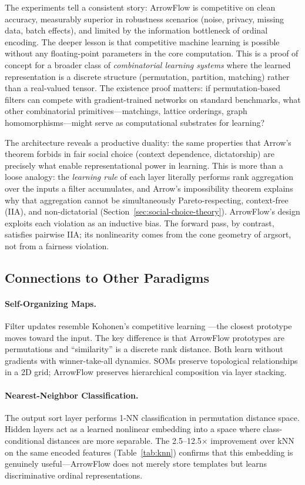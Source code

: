 \documentclass[12pt]{article}
\begin{document}
The experiments tell a consistent story: ArrowFlow is competitive on clean accuracy, measurably superior in robustness scenarios (noise, privacy, missing data, batch effects), and limited by the information bottleneck of ordinal encoding. The deeper lesson is that competitive machine learning is possible without any floating-point parameters in the core computation. This is a proof of concept for a broader class of \emph{combinatorial learning systems} where the learned representation is a discrete structure (permutation, partition, matching) rather than a real-valued tensor. The existence proof matters: if permutation-based filters can compete with gradient-trained networks on standard benchmarks, what other combinatorial primitives---matchings, lattice orderings, graph homomorphisms---might serve as computational substrates for learning?

The architecture reveals a productive duality: the same properties that Arrow's theorem forbids in fair social choice (context dependence, dictatorship) are precisely what enable representational power in learning. This is more than a loose analogy: the \emph{learning rule} of each layer literally performs rank aggregation over the inputs a filter accumulates, and Arrow's impossibility theorem explains why that aggregation cannot be simultaneously Pareto-respecting, context-free (IIA), and non-dictatorial (Section~\ref{sec:social-choice-theory}). ArrowFlow's design exploits each violation as an inductive bias. The forward pass, by contrast, satisfies pairwise IIA; its nonlinearity comes from the cone geometry of argsort, not from a fairness violation.

\subsection{Connections to Other Paradigms}

\paragraph{Self-Organizing Maps.}
Filter updates resemble Kohonen's competitive learning \citep{kohonen1990self}---the closest prototype moves toward the input. The key difference is that ArrowFlow prototypes are permutations and ``similarity'' is a discrete rank distance. Both learn without gradients with winner-take-all dynamics. SOMs preserve topological relationships in a 2D grid; ArrowFlow preserves hierarchical composition via layer stacking.

\paragraph{Nearest-Neighbor Classification.}
The output sort layer performs 1-NN classification in permutation distance space. Hidden layers act as a learned nonlinear embedding into a space where class-conditional distances are more separable. The 2.5--12.5$\times$ improvement over kNN on the same encoded features (Table~\ref{tab:knn}) confirms that this embedding is genuinely useful---ArrowFlow does not merely store templates but learns discriminative ordinal representations.
\end{document}
